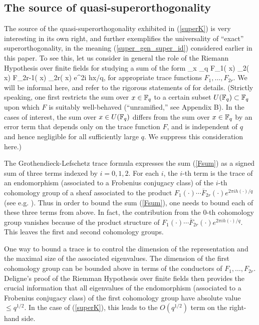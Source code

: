 \documentclass[oneside,11pt]{amsart}
\begin{document}
 
 


\subsection{The source of quasi-superorthogonality}

 

The  source of the quasi-superorthogonality   exhibited in (\ref{superK}) is very interesting in its own right, and further exemplifies the universality of ``exact'' superorthogonality, in the meaning (\ref{super_gen_super_id}) considered earlier in this paper. To see this, let us consider in general the role of the Riemann Hypothesis over finite fields for studying a sum of the form 
\beq\label{Fsum} \sum_{x \in \F_q} F_1( x) _2( x) \cdots  F_{2r-1}(  x) _{2r}( x) e^{2\pi i hx/q},
\eeq
for appropriate trace functions $F_1, \ldots, F_{2r}$. 
We will be  informal here, and refer to the rigorous statements of  \cite[Proposition 1.1]{FKM15} for details.
(Strictly speaking, one first restricts the sum over $x \in \mathbb{F}_q$ to a  certain subset $U(\mathbb{F}_q) \subset \mathbb{F}_q$ upon which $F$ is suitably well-behaved (``unramified,'' see Appendix B). In the cases of interest, the sum over $x \in U(\mathbb{F}_q)$ differs from the sum over $x \in \mathbb{F}_q$ by an error term that depends only on the trace function $F$, and is independent of $q$  and hence negligible for all sufficiently large $q$. We suppress this consideration   here.)

The Grothendieck-Lefschetz trace formula  expresses the sum (\ref{Fsum}) as a signed sum of three terms indexed by $i=0,1,2$. For each $i$, the $i$-th term is the trace of an endomorphism (associated to a Frobenius conjugacy class) of the $i$-th cohomology group of a sheaf associated to the product $F_1(  \cdot )   \cdots   \overline{ F}_{2r}( \cdot ) e^{2\pi i h ( \cdot) /q}$ (see e.g. \cite[Thm. 4.1]{FKMS19}). Thus in order to bound the sum (\ref{Fsum}), one needs to bound each of these three terms from above. In fact, the contribution from the $0$-th cohomology group vanishes because of the product structure of $F_1(  \cdot )   \cdots   \overline{ F}_{2r}( \cdot ) e^{2\pi i h ( \cdot) /q}$. This leaves the first  and second cohomology groups. 

One way to bound a trace is   to control the dimension of the representation and the maximal size of the associated eigenvalues. 
The dimension of the first cohomology group  can be bounded above in terms of the conductors of $F_1, \ldots, F_{2r}$. 
Deligne's proof of the Riemman Hypothesis over finite fields \cite{Del80} then provides the crucial information that  all eigenvalues of the endomorphism (associated to a Frobenius conjugacy class) of the first cohomology group have absolute value $\leq q^{1/2}$. In the case of (\ref{superK}), this leads to the $O(q^{1/2})$ term   on the right-hand side.
\end{document}
